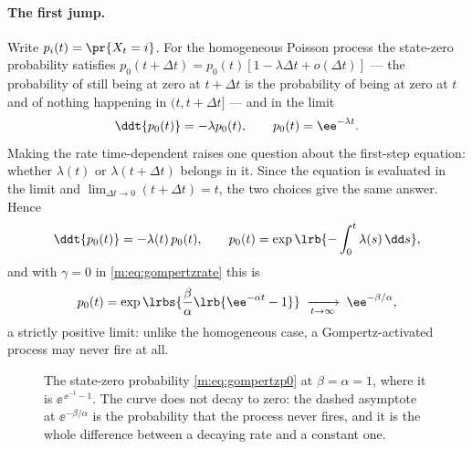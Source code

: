 \paragraph{The first jump.}
Write $p_i(t)=\pr{X_t=i}$. For the homogeneous Poisson process the state-zero
probability satisfies $p_0(t+\Delta t)=p_0(t)[1-\lambda\Delta t+o(\Delta t)]$
--- the probability of still being at zero at $t+\Delta t$ is the
probability of being at zero at $t$ and of nothing happening in
$(t,t+\Delta t]$ --- and in the limit
\begin{equation}
\ddt{p_0(t)}=-\lambda p_0(t),
\qquad p_0(t)=\ee^{-\lambda t}.
\label{m:eq:poissonp0}
\end{equation}
Making the rate time-dependent raises one question about the first-step
equation: whether $\lambda(t)$ or $\lambda(t+\Delta t)$ belongs in it. Since
the equation is evaluated in the limit and
$\lim_{\Delta t\to0}(t+\Delta t)=t$, the two choices give the same answer.
Hence
\begin{equation}
\ddt{p_0(t)}=-\lambda(t)\,p_0(t),
\qquad
p_0(t)=\exp\lrb{-\int_0^t\lambda(s)\,\dd s},
\label{m:eq:inhompoissonp0}
\end{equation}
and with $\gamma=0$ in \cref{m:eq:gompertzrate} this is
\begin{equation}
p_0(t)=\exp\lrbs{\frac{\beta}{\alpha}\lrb{\ee^{-\alpha t}-1}}
\;\xrightarrow[t\to\infty]{}\;
\ee^{-\beta/\alpha},
\label{m:eq:gompertzp0}
\end{equation}
a strictly positive limit: unlike the homogeneous case, a Gompertz-activated
process may never fire at all.

\begin{figure}[tbp]
\centering
{}
\caption{The state-zero probability \cref{m:eq:gompertzp0} at
$\beta=\alpha=1$, where it is $\ee^{\,\ee^{-t}-1}$. The curve does not decay
to zero: the dashed asymptote at $\ee^{-\beta/\alpha}$ is the probability
that the process never fires, and it is the whole difference between a
decaying rate and a constant one.}
\label{m:fig:gompertzp0}
\end{figure}

